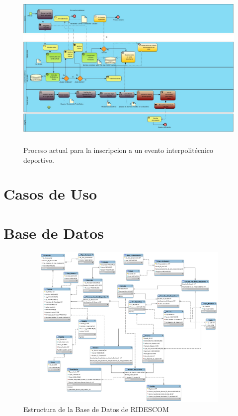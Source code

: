 		\begin{figure}[hbt!]
			\centering
			\includegraphics[width=16cm, height=8cm]{Imagenes/Disenos/ProcesoInscripcionPropuesto.jpg}
			\caption{Proceso actual para la inscripcion a un evento interpolitécnico deportivo.}
			\label{Inscripcion}
		\end{figure}
	\pagebreak

	\section{Casos de Uso}
		
		
		
		
		
		
	
	\section{Base de Datos}
		\begin{figure}[hbt!]
			\centering
			\includegraphics[width=16cm, height=8cm]{Imagenes/Disenos/BasedeDatos.png}
			\caption{Estructura de la Base de Datos de RIDESCOM}
			\label{BaseDatos}
		\end{figure}
